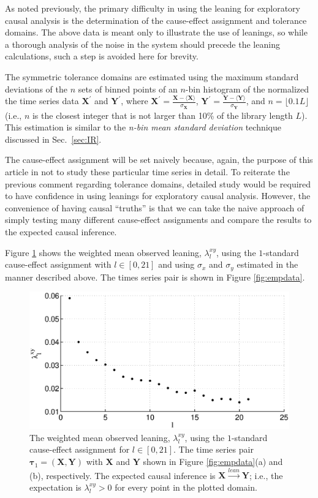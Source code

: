 \documentclass[twocolumn,aps,pre,groupedaddress]{revtex4-1}
\begin{document}
As noted previously, the primary difficulty in using the leaning for exploratory causal analysis is the determination of the cause-effect assignment and tolerance domains.  The above data is meant only to illustrate the use of leanings, so while a thorough analysis of the noise in the system should precede the leaning calculations, such a step is avoided here for brevity.  

The symmetric tolerance domains are estimated using the maximum standard deviations of the $n$ sets of binned points of an $n$-bin histogram of the normalized the time series data $\mathbf{X}^\prime$ and $\mathbf{Y}^\prime$, where $\mathbf{X}^\prime = \frac{\mathbf{X}-\langle \mathbf{X} \rangle}{\sigma_\mathbf{X}}$, $\mathbf{Y}^\prime = \frac{\mathbf{Y}-\langle \mathbf{Y} \rangle}{\sigma_\mathbf{Y}}$, and $n=\lfloor 0.1L\rfloor$ (i.e., $n$ is the closest integer that is not larger than 10\% of the library length $L$).  This estimation is similar to the {\em n-bin mean standard deviation} technique discussed in Sec.\ \ref{sec:IR}.

The cause-effect assignment will be set naively because, again, the purpose of this article in not to study these particular time series in detail.  To reiterate the previous comment regarding tolerance domains, detailed study would be required to have confidence in using leanings for exploratory causal analysis.  However, the convenience of having causal ``truths'' is that we can take the naive approach of simply testing many different cause-effect assignments and compare the results to the expected causal inference.

Figure \ref{fig:emp} shows the weighted mean observed leaning, $\lambda_l^{xy}$, using the $1$-standard cause-effect assignment with $l\in[0,21]$ and using $\sigma_x$ and $\sigma_y$ estimated in the manner described above.  The times series pair is shown in Figure \ref{fig:empdata}.  
\begin{figure}
\includegraphics[scale=0.40]{EmpiricalData_p87leans.eps}
\caption{The weighted mean observed leaning, $\lambda_l^{xy}$, using the $1$-standard cause-effect assignment for $l\in[0,21]$.  The time series pair $\mathbf{\tau}_1 = (\mathbf{X},\mathbf{Y})$ with $\mathbf{X}$ and $\mathbf{Y}$ shown in Figure \ref{fig:empdata}(a) and (b), respectively.  The expected causal inference is $\mathbf{X}\xrightarrow{lean}\mathbf{Y}$; i.e., the expectation is $\lambda_l^{xy} > 0$ for every point in the plotted domain.}
\label{fig:emp}
\end{figure}
\end{document}
